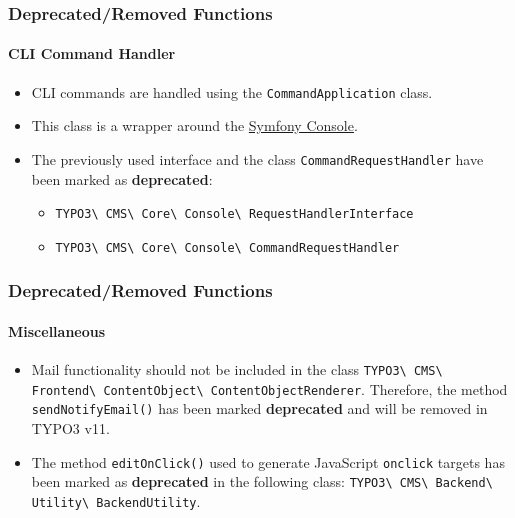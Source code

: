\begin{frame}[fragile]
	\frametitle{Deprecated/Removed Functions}
	\framesubtitle{CLI Command Handler}

	\begin{itemize}
		\item CLI commands are handled using the \texttt{CommandApplication} class.
		\item This class is a wrapper around the
			\href{https://symfony.com/doc/current/components/console.html}{Symfony Console}.

		\item The previously used interface and the class \texttt{CommandRequestHandler} have been marked as \textbf{deprecated}:

			\begin{itemize}
				\item
					\texttt{TYPO3\textbackslash
						CMS\textbackslash
						Core\textbackslash
						Console\textbackslash
						RequestHandlerInterface}
				\item
					\texttt{TYPO3\textbackslash
						CMS\textbackslash
						Core\textbackslash
						Console\textbackslash
						CommandRequestHandler}
			\end{itemize}

	\end{itemize}

\end{frame}


\begin{frame}[fragile]
	\frametitle{Deprecated/Removed Functions}
	\framesubtitle{Miscellaneous}

	\begin{itemize}
		\item Mail functionality should not be included in the class\newline
			\small
				\texttt{TYPO3\textbackslash
					CMS\textbackslash
					Frontend\textbackslash
					ContentObject\textbackslash
					ContentObjectRenderer}.\newline
			\normalsize
			Therefore, the method \texttt{sendNotifyEmail()} has been marked \textbf{deprecated} and will be removed in TYPO3 v11.

		\item The method \texttt{editOnClick()} used to generate JavaScript \texttt{onclick}
			targets has been marked as \textbf{deprecated} in the following class:\newline
			\small
				\texttt{TYPO3\textbackslash
					CMS\textbackslash
					Backend\textbackslash
					Utility\textbackslash
					BackendUtility}.
			\normalsize

	\end{itemize}

\end{frame}


